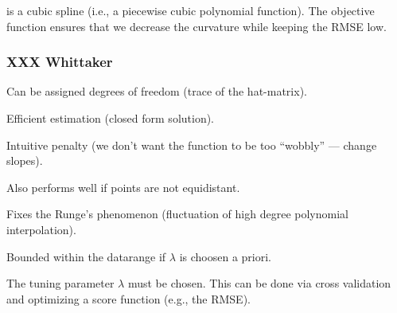 		is a %
		cubic spline (i.e., a piecewise cubic polynomial function).
		The objective function ensures that we decrease the curvature while keeping the RMSE low.

		\subsubsection{XXX Whittaker}

		\begin{my_pros_cons_table}{
				\item Can be assigned degrees of freedom (trace of the hat-matrix).
				\item Efficient estimation (closed form solution).
				\item Intuitive penalty (we don't want the function to be too ``wobbly'' --- change slopes).
				\item Also performs well if points are not equidistant.
				\item Fixes the Runge's phenomenon (fluctuation of high degree polynomial interpolation).
				\item Bounded within the datarange if $\lambda$ is choosen a priori.
			}{
				\item The tuning parameter $\lambda$ must be chosen. This can be done via cross validation and optimizing a score function (e.g., the RMSE). 
			}
		\end{my_pros_cons_table}



